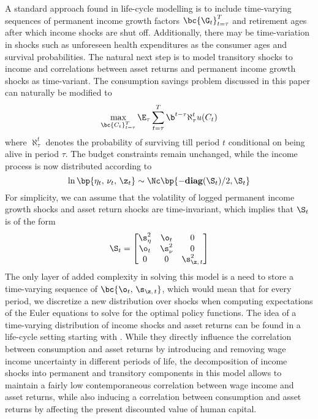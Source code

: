 A standard approach found in life-cycle modelling is to include time-varying sequences of permanent income growth factors $\bc{\G_{t}}_{t=\tau}^{T}$ and retirement ages after which income shocks are shut off. Additionally, there may be time-variation in shocks such as unforeseen health expenditures as the consumer ages and survival probabilities. The natural next step is to model transitory shocks to income and correlations between asset returns and permanent income growth shocks as time-variant. The consumption savings problem discussed in this paper can naturally be modified to
\[
\max_{\bc{C_{t}}_{t=\tau}^{T}}\E_{\tau}\sum_{t=\tau}^{T}\b^{t - \tau}\aleph_{\tau}^{t}u(C_{t})
\]
where $\aleph_{\tau}^{t}$ denotes the probability of surviving till period $t$ conditional on being alive in period $\tau$. The budget constraints remain unchanged, while the income process is now distributed according to
\[
\ln\bp{\eta_t,\,\nu_t,\,\z_t} \sim \Nc\bp{-\textbf{diag}(\S_t)/2, \S_t}
\]
For simplicity, we can assume that the volatility of logged permanent income growth shocks and asset return shocks are time-invariant, which implies that $\S_{t}$ is of the form
\[
\S_{t} = \begin{bmatrix}
    \s_{\eta}^2 & \o_t & 0\\
    \o_t & \s_{\nu}^2 & 0\\
    0 & 0 & \s_{\z,\,t}^2
\end{bmatrix}
\]
The only layer of added complexity in solving this model is a need to store a time-varying sequence of $\bc{\o_{t},\,\s_{\z,\,t}}$, which would mean that for every period, we discretize a new distribution over shocks when computing expectations of the Euler equations to solve for the optimal policy functions. The idea of a time-varying distribution of income shocks and asset returns can be found in a life-cycle setting starting with \citet{Constantinides2002}. While they directly influence the correlation between consumption and asset returns by introducing and removing wage income uncertainty in different periods of life, the decomposition of income shocks into permanent and transitory components in this model allows to maintain a fairly low contemporaneous correlation between wage income and asset returns, while also inducing a correlation between consumption and asset returns by affecting the present discounted value of human capital.